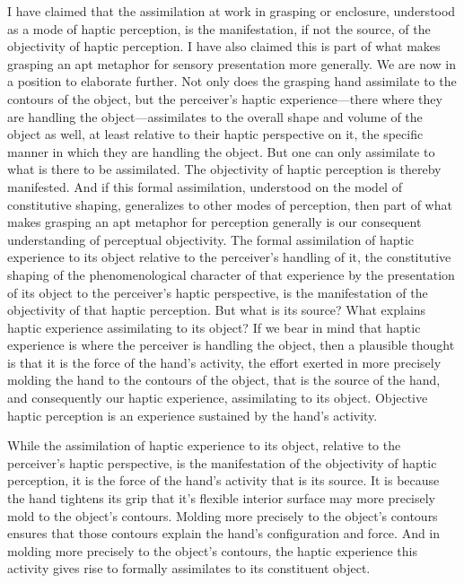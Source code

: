 I have claimed that the assimilation at work in grasping or enclosure, understood as a mode of haptic perception, is the manifestation, if not the source, of the objectivity of haptic perception. I have also claimed this is part of what makes grasping an apt metaphor for sensory presentation more generally. We are now in a position to elaborate further. Not only does the grasping hand assimilate to the contours of the object, but the perceiver's haptic experience---there where they are handling the object---assimilates to the overall shape and volume of the object as well, at least relative to their haptic perspective on it, the specific manner in which they are handling the object. But one can only assimilate to what is there to be assimilated. The objectivity of haptic perception is thereby manifested. And if this formal assimilation, understood on the model of constitutive shaping, generalizes to other modes of perception, then part of what makes grasping an apt metaphor for perception generally is our consequent understanding of perceptual objectivity. The formal assimilation of haptic experience to its object relative to the perceiver's handling of it, the constitutive shaping of the phenomenological character of that experience by the presentation of its object to the perceiver's haptic perspective, is the manifestation of the objectivity of that haptic perception. But what is its source? What explains haptic experience assimilating to its object? If we bear in mind that haptic experience is where the perceiver is handling the object, then a plausible thought is that it is the force of the hand's activity, the effort exerted in more precisely molding the hand to the contours of the object, that is the source of the hand, and consequently our haptic experience, assimilating to its object. Objective haptic perception is an experience sustained by the hand's activity.

While the assimilation of haptic experience to its object, relative to the perceiver's haptic perspective, is the manifestation of the objectivity of haptic perception, it is the force of the hand's activity that is its source. It is because the hand tightens its grip that it's flexible interior surface may more precisely mold to the object's contours. Molding more precisely to the object's contours ensures that those contours explain the hand's configuration and force. And in molding more precisely to the object's contours, the haptic experience this activity gives rise to formally assimilates to its constituent object. 

